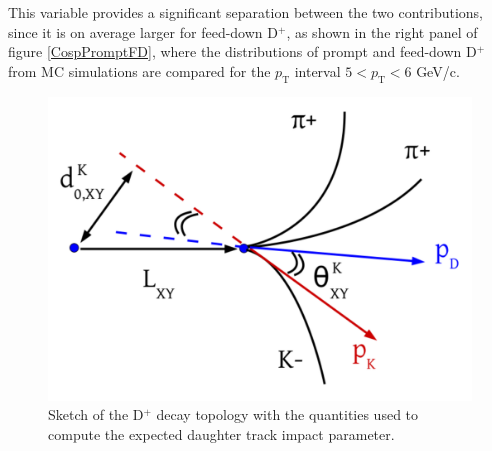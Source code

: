 \documentclass[b5paper,10pt,twoside,oldstyle,classica]{toptesi}
\newcommand{\pt}{p_\text{T}}
\begin{document}
This variable provides a significant separation between the two contributions, since it is on average larger for feed-down D$^+$, as shown in the right panel of figure \ref{CospPromptFD}, where the distributions of prompt and feed-down D$^+$ from MC simulations are compared for the $\pt$ interval $5<\pt<6$ GeV/c.
\begin{figure}[tb]
\begin{center}
\includegraphics[scale = 0.3]{topomatic.pdf}
\caption{Sketch of the D$^+$ decay topology with the quantities used to compute the expected daughter track impact parameter.}
\label{topomatic}
\end{center}
\end{figure}
\end{document}
